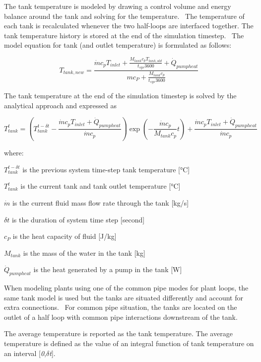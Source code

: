 The tank temperature is modeled by drawing a control volume and energy balance around the tank and solving for the temperature.~ The temperature of each tank is recalculated whenever the two half-loops are interfaced together. The tank temperature history is stored at the end of the simulation timestep.~ The model equation for tank (and outlet temperature) is formulated as follows:

\begin{equation}
{T_{tank,new}} = \frac{{\dot m{c_p}{T_{inlet}} + \frac{{{M_{tank}}{c_p}{T_{tank,old}}}}{{{t_{sys}}3600}} + {{\dot Q}_{pumpheat}}}}{{m{c_P}} + \frac{{{M_{tank}}{c_p}}}{{{t_{sys}}3600}}}
\end{equation}

The tank temperature at the end of the simulation timestep is solved by the analytical approach and expressed as

\begin{equation}
T_{tank}^t = \left( {T_{tank}^{t - \delta t} - \frac{{\dot m{c_p}{T_{inlet}} + {{\dot Q}_{pumpheat}}}}{{\dot m{c_p}}}} \right)\exp \left( { - \frac{{\dot m{c_p}}}{{{M_{tank}}{c_p}}}t} \right) + \frac{{\dot m{c_p}{T_{inlet}} + {{\dot Q}_{pumpheat}}}}{{\dot m{c_p}}}
\end{equation}

where:

\(T_{tank}^{t - \delta t}\) is the previous system time-step tank temperature {[}°C{]}

\(T_{tank}^t\) is the current tank and tank outlet temperature {[}°C{]}

\(\dot m\) is the current fluid mass flow rate through the tank {[}kg/s{]}

\(\delta t\) is the duration of system time step {[}second{]}

\({c_P}\) is the heat capacity of fluid {[}J/kg{]}

\({M_{tank}}\) is the mass of the water in the tank {[}kg{]}

\({\dot Q_{pumpheat}}\) is the heat generated by a pump in the tank {[}W{]}

When modeling plants using one of the common pipe modes for plant loops, the same tank model is used but the tanks are situated differently and account for extra connections.~ For common pipe situation, the tanks are located on the outlet of a half loop with common pipe interactions downstream of the tank.

The average temperature is reported as the tank temperature. The average temperature is defined as the value of an integral function of tank temperature on an interval {[}\emph{0},\emph{\(\delta\)t}{]}.

